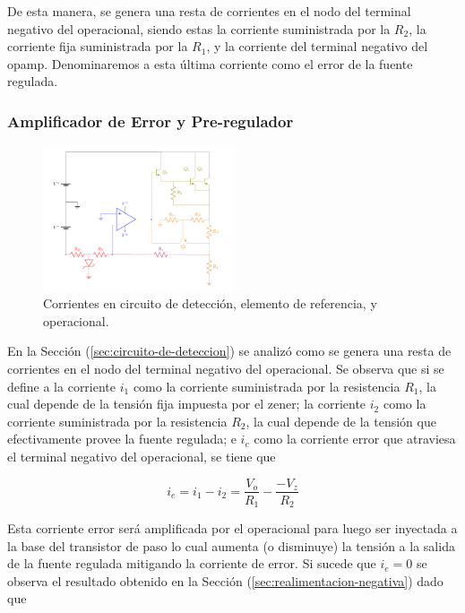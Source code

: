  De esta manera, se genera una resta de corrientes en el nodo del terminal negativo del operacional, siendo estas la corriente suministrada por la $R_2$, la corriente fija suministrada por la $R_1$, y la corriente del terminal negativo del opamp. Denominaremos a esta última corriente como el error de la fuente regulada.

\subsubsection{Amplificador de Error y Pre-regulador}

\begin{figure}[H]
\centering
	\includegraphics[width=0.5\textwidth, page=8]{ImagenesEjercicio2/Regulador.pdf}
	\caption{Corrientes en circuito de detección, elemento de referencia, y operacional.}
	\label{fig:amp-prereg-det-ref}
\end{figure}

En la Sección (\ref{sec:circuito-de-deteccion}) se analizó como se genera una resta de corrientes en el nodo del terminal negativo del operacional. Se observa que si se define a la corriente $i_1$ como la corriente suministrada por la resistencia $R_1$, la cual depende de la tensión fija impuesta por el zener; la corriente $i_2$ como la corriente suministrada por la resistencia $R_2$, la cual depende de la tensión que efectivamente provee la fuente regulada; e $i_e$ como la corriente error que atraviesa el terminal negativo del operacional, se tiene que

\begin{equation}
i_e = i_1 - i_2 = \frac{V_o}{R_1} - \frac{-V_z}{R_2}
\end{equation}

Esta corriente error será amplificada por el operacional para luego ser inyectada a la base del transistor de paso lo cual aumenta (o disminuye) la tensión a la salida de la fuente regulada mitigando la corriente de error. Si sucede que $i_e = 0$ se observa el resultado obtenido en la Sección (\ref{sec:realimentacion-negativa}) dado que

